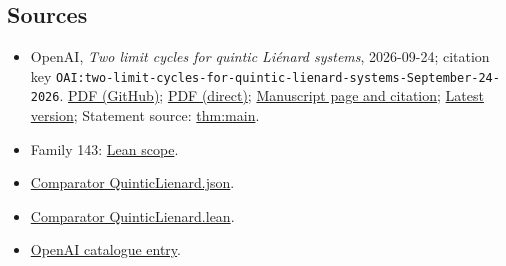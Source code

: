 \documentclass[11pt]{article}
\begin{document}
\subsection{Sources}
\begin{itemize}
\item OpenAI, \emph{Two limit cycles for quintic Liénard systems}, 2026-09-24; citation key \texttt{OAI:two-limit-cycles-for-quintic-lienard-systems-September-24-2026}. \href{https://github.com/openai/math/blob/adc7f1241b42e322a6451854ab7e4b4c146bf78a/preprints/two-limit-cycles-for-quintic-lienard-systems-September-24-2026/two-limit-cycles-for-quintic-lienard-systems-September-24-2026.pdf}{PDF (GitHub)}; \href{https://github.com/openai/math/raw/adc7f1241b42e322a6451854ab7e4b4c146bf78a/preprints/two-limit-cycles-for-quintic-lienard-systems-September-24-2026/two-limit-cycles-for-quintic-lienard-systems-September-24-2026.pdf}{PDF (direct)}; \href{https://github.com/openai/math/blob/adc7f1241b42e322a6451854ab7e4b4c146bf78a/preprints/two-limit-cycles-for-quintic-lienard-systems-September-24-2026/README.md}{Manuscript page and citation}; \href{https://github.com/openai/math/blob/main/preprints/two-limit-cycles-for-quintic-lienard-systems-September-24-2026/two-limit-cycles-for-quintic-lienard-systems-September-24-2026.pdf}{Latest version}; Statement source: \href{https://github.com/openai/math/blob/adc7f1241b42e322a6451854ab7e4b4c146bf78a/preprints/two-limit-cycles-for-quintic-lienard-systems-September-24-2026/build/sections/introduction.tex\#L13}{thm:main}.
\item Family 143: \href{https://github.com/openai/math/blob/adc7f1241b42e322a6451854ab7e4b4c146bf78a/lean/docs/143.md}{Lean scope}.
\item \href{https://github.com/openai/math/blob/adc7f1241b42e322a6451854ab7e4b4c146bf78a/lean/ComparatorChallenges/QuinticLienard.json}{Comparator QuinticLienard.json}.
\item \href{https://github.com/openai/math/blob/adc7f1241b42e322a6451854ab7e4b4c146bf78a/lean/ComparatorChallenges/QuinticLienard.lean}{Comparator QuinticLienard.lean}.
\item \href{https://github.com/openai/math/blob/adc7f1241b42e322a6451854ab7e4b4c146bf78a/CONTENTS.md}{OpenAI catalogue entry}.
\end{itemize}
\end{document}
